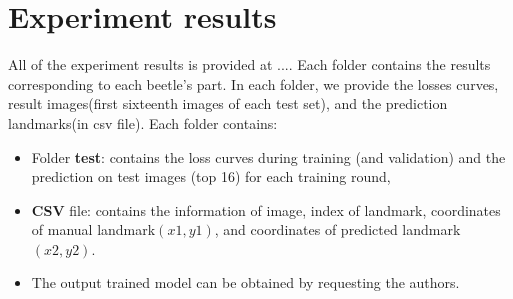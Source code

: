 \documentclass[12pt,a4paper]{article}
\begin{document}
\section{Experiment results}
All of the experiment results is provided at .... Each folder contains the results corresponding to each beetle's part. In each folder, we provide the losses curves, result images(first sixteenth images of each test set), and the prediction landmarks(in csv file). Each folder contains:
\begin{itemize}
	\item Folder \textbf{test}: contains the loss curves during training (and validation) and the prediction on test images (top 16) for each training round,
	\item \textbf{CSV} file: contains the information of image, index of landmark, coordinates of manual landmark$(x1,y1)$, and coordinates of predicted landmark$(x2,y2)$.
	\item The output trained model can be obtained by requesting the authors.
\end{itemize}
\end{document}
